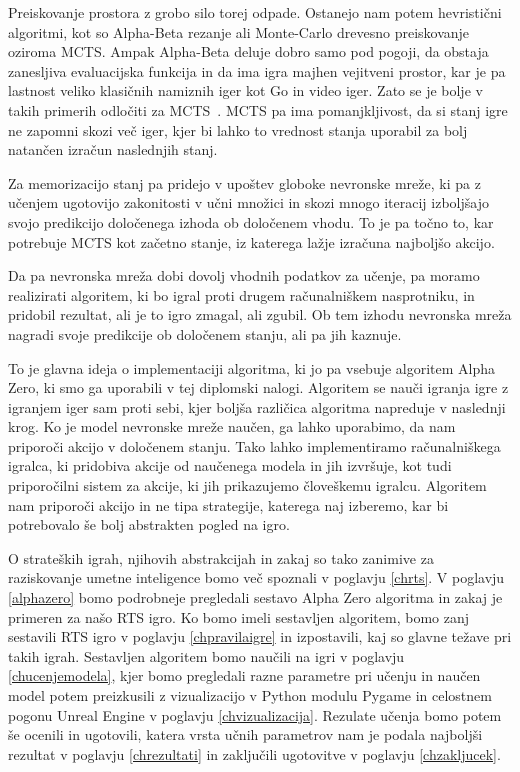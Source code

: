 \documentclass[a4paper, 12pt]{book}
\begin{document}
Preiskovanje prostora z grobo silo torej odpade. 
Ostanejo nam potem hevristični algoritmi, kot so Alpha-Beta rezanje ali Monte-Carlo drevesno preiskovanje oziroma MCTS. 
Ampak Alpha-Beta deluje dobro samo pod pogoji, da obstaja zanesljiva evaluacijska funkcija in da ima igra majhen vejitveni prostor, kar je pa lastnost veliko klasičnih namiznih iger kot Go in video iger. Zato se je bolje v takih primerih odločiti za MCTS~\cite{chaslot2008monte}.
MCTS pa ima pomanjkljivost, da si stanj igre ne zapomni skozi več iger, kjer bi lahko to vrednost stanja uporabil za bolj natančen izračun naslednjih stanj.

Za memorizacijo stanj pa pridejo v upoštev globoke nevronske mreže, ki pa z učenjem ugotovijo zakonitosti v učni množici in skozi mnogo iteracij izboljšajo svojo predikcijo določenega izhoda ob določenem vhodu. To je pa točno to, kar potrebuje MCTS kot začetno stanje, iz katerega lažje izračuna najboljšo akcijo.

Da pa nevronska mreža dobi dovolj vhodnih podatkov za učenje, pa moramo realizirati algoritem, ki bo igral proti drugem računalniškem nasprotniku, in pridobil rezultat, ali je to igro zmagal, ali zgubil. 
Ob tem izhodu nevronska mreža nagradi svoje predikcije ob določenem stanju, ali pa jih kaznuje.

To je glavna ideja o implementaciji algoritma, ki jo pa vsebuje algoritem Alpha Zero, ki smo ga uporabili v tej diplomski nalogi.
Algoritem se nauči igranja igre z igranjem iger sam proti sebi, kjer boljša različica algoritma napreduje v naslednji krog.
Ko je model nevronske mreže naučen, ga lahko uporabimo, da nam priporoči akcijo v določenem stanju.
Tako lahko implementiramo računalniškega igralca, ki pridobiva akcije od naučenega modela in jih izvršuje, kot tudi priporočilni sistem za akcije, ki jih prikazujemo človeškemu igralcu. 
Algoritem nam priporoči akcijo in ne tipa strategije, katerega naj izberemo, kar bi potrebovalo še bolj abstrakten pogled na igro. 

O strateških igrah, njihovih abstrakcijah in zakaj so tako zanimive za raziskovanje umetne inteligence bomo več spoznali v poglavju \ref{chrts}.
V poglavju \ref{alphazero} bomo podrobneje pregledali sestavo Alpha Zero algoritma in zakaj je primeren za našo RTS igro.
Ko bomo imeli sestavljen algoritem, bomo zanj sestavili RTS igro v poglavju \ref{chpravilaigre} in izpostavili, kaj so glavne težave pri takih igrah.
Sestavljen algoritem bomo naučili na igri v poglavju \ref{chucenjemodela}, kjer bomo pregledali razne parametre pri učenju in naučen model potem preizkusili z vizualizacijo v Python modulu Pygame in celostnem pogonu Unreal Engine v poglavju \ref{chvizualizacija}.
Rezulate učenja bomo potem še ocenili in ugotovili, katera vrsta učnih parametrov nam je podala najboljši rezultat v poglavju \ref{chrezultati} in zaključili ugotovitve v poglavju \ref{chzakljucek}.
\end{document}
